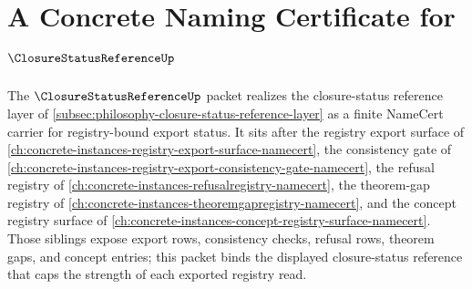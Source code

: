 \chapter{A Concrete Naming Certificate for $\ClosureStatusReferenceUp$}
\label{ch:concrete-instances-closure-status-reference-namecert}

The $\ClosureStatusReferenceUp$ packet realizes the closure-status reference layer of \autoref{subsec:philosophy-closure-status-reference-layer} as a finite NameCert carrier for registry-bound export status. It sits after the registry export surface of \autoref{ch:concrete-instances-registry-export-surface-namecert}, the consistency gate of \autoref{ch:concrete-instances-registry-export-consistency-gate-namecert}, the refusal registry of \autoref{ch:concrete-instances-refusalregistry-namecert}, the theorem-gap registry of \autoref{ch:concrete-instances-theoremgapregistry-namecert}, and the concept registry surface of \autoref{ch:concrete-instances-concept-registry-surface-namecert}. Those siblings expose export rows, consistency checks, refusal rows, theorem gaps, and concept entries; this packet binds the displayed closure-status reference that caps the strength of each exported registry read.

